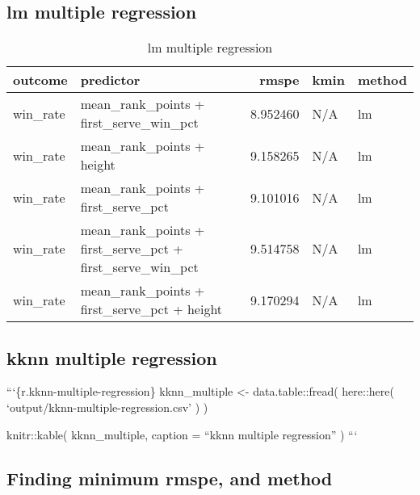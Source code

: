 \documentclass[
]{article}
\begin{document}
\hypertarget{lm-multiple-regression}{%
\subsection{lm multiple regression}\label{lm-multiple-regression}}

\begin{table}

\caption{\label{tab:lm-multiple-regression}lm multiple regression}
\centering
\begin{tabular}[t]{l|l|r|l|l}
\hline
outcome & predictor & rmspe & kmin & method\\
\hline
win\_rate & mean\_rank\_points + first\_serve\_win\_pct & 8.952460 & N/A & lm\\
\hline
win\_rate & mean\_rank\_points + height & 9.158265 & N/A & lm\\
\hline
win\_rate & mean\_rank\_points + first\_serve\_pct & 9.101016 & N/A & lm\\
\hline
win\_rate & mean\_rank\_points + first\_serve\_pct + first\_serve\_win\_pct & 9.514758 & N/A & lm\\
\hline
win\_rate & mean\_rank\_points + first\_serve\_pct + height & 9.170294 & N/A & lm\\
\hline
\end{tabular}
\end{table}

\hypertarget{kknn-multiple-regression}{%
\subsection{kknn multiple regression}\label{kknn-multiple-regression}}

```\{r.kknn-multiple-regression\}
kknn\_multiple \textless- data.table::fread(
here::here(
`output/kknn-multiple-regression.csv'
)
)

knitr::kable(
kknn\_multiple,
caption = ``kknn multiple regression''
)
```

\hypertarget{finding-minimum-rmspe-and-method}{%
\subsection{Finding minimum rmspe, and method}\label{finding-minimum-rmspe-and-method}}
\end{document}
